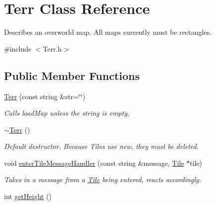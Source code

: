 \hypertarget{class_terr}{}\section{Terr Class Reference}
\label{class_terr}


Describes an overworld map. All maps currently must be rectangles.  




{\ttfamily \#include $<$Terr.\+h$>$}

\subsection*{Public Member Functions}
\begin{DoxyCompactItemize}
\item 
\hyperlink{class_terr_a947a7229cb37a0e87d340f6b88f46994}{Terr} (const string \&str=\char`\"{}\char`\"{})\hypertarget{class_terr_a947a7229cb37a0e87d340f6b88f46994}{}\label{class_terr_a947a7229cb37a0e87d340f6b88f46994}

\begin{DoxyCompactList}\small\item\em Calls load\+Map unless the string is empty. \end{DoxyCompactList}\item 
\hyperlink{class_terr_a8b68000bbfdc821e364bdb89f4465c17}{$\sim$\+Terr} ()\hypertarget{class_terr_a8b68000bbfdc821e364bdb89f4465c17}{}\label{class_terr_a8b68000bbfdc821e364bdb89f4465c17}

\begin{DoxyCompactList}\small\item\em Default destructor. Because Tiles use new, they must be deleted. \end{DoxyCompactList}\item 
void \hyperlink{class_terr_ad082e4ae9fa5527df4dbfca775a33945}{enter\+Tile\+Message\+Handler} (const string \&message, \hyperlink{class_tile}{Tile} $\ast$tile)\hypertarget{class_terr_ad082e4ae9fa5527df4dbfca775a33945}{}\label{class_terr_ad082e4ae9fa5527df4dbfca775a33945}

\begin{DoxyCompactList}\small\item\em Takes in a message from a \hyperlink{class_tile}{Tile} being entered, reacts accordingly. \end{DoxyCompactList}\item 
int \hyperlink{class_terr_a0ef7c8147e12a2291fc84d9ebc67a8df}{get\+Height} ()\hypertarget{class_terr_a0ef7c8147e12a2291fc84d9ebc67a8df}{}\label{class_terr_a0ef7c8147e12a2291fc84d9ebc67a8df}


\end{DoxyCompactItemize}
